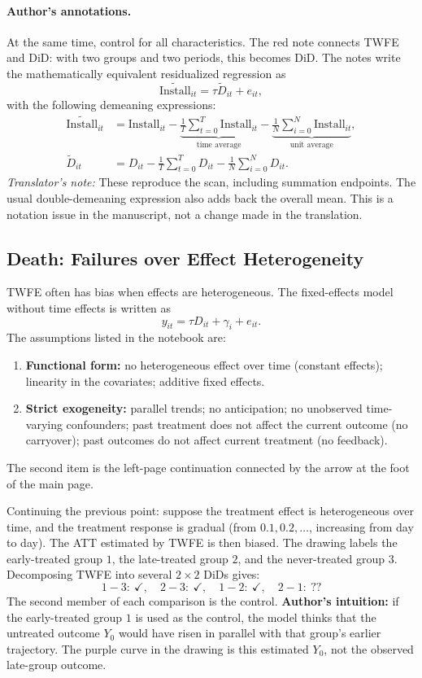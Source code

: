 \paragraph{Author's annotations.}
At the same time, control for all characteristics. The red note connects TWFE and DiD: with two groups and two periods, this becomes DiD.
The notes write the mathematically equivalent residualized regression as
\[
\widetilde{\mathrm{Install}}_{it}=\tau\widetilde D_{it}+e_{it},
\]
with the following demeaning expressions:
\begin{align*}
\widetilde{\mathrm{Install}}_{it}
 &=\mathrm{Install}_{it}
 -\underbrace{\frac1T\sum_{t=0}^{T}\mathrm{Install}_{it}}_{\text{time average}}
 -\underbrace{\frac1N\sum_{i=0}^{N}\mathrm{Install}_{it}}_{\text{unit average}},\\
\widetilde D_{it}
 &=D_{it}-\frac1T\sum_{t=0}^{T}D_{it}-\frac1N\sum_{i=0}^{N}D_{it}.
\end{align*}
\textit{Translator's note:} These reproduce the scan, including summation endpoints. The usual double-demeaning expression also adds back the overall mean. This is a notation issue in the manuscript, not a change made in the translation.

\subsection{Death: Failures over Effect Heterogeneity}
TWFE often has bias when effects are heterogeneous. The fixed-effects model without time effects is written as
\[
y_{it}=\tau D_{it}+\gamma_i+e_{it}.
\]
The assumptions listed in the notebook are:
\begin{enumerate}
\item \textbf{Functional form:} no heterogeneous effect over time (constant effects); linearity in the covariates; additive fixed effects.
\item \textbf{Strict exogeneity:} parallel trends; no anticipation; no unobserved time-varying confounders; past treatment does not affect the current outcome (no carryover); past outcomes do not affect current treatment (no feedback).
\end{enumerate}
The second item is the left-page continuation connected by the arrow at the foot of the main page.

Continuing the previous point: suppose the treatment effect is heterogeneous over time, and the treatment response is gradual (from \(0.1,0.2,\ldots\), increasing from day to day). The ATT estimated by TWFE is then biased.
The drawing labels the early-treated group \(1\), the late-treated group \(2\), and the never-treated group \(3\). Decomposing TWFE into several \(2\times2\) DiDs gives:
\[
1-3:\ \checkmark,\quad
2-3:\ \checkmark,\quad
1-2:\ \checkmark,\quad
2-1:\ \text{??}
\]
The second member of each comparison is the control. \textbf{Author's intuition:} if the early-treated group \(1\) is used as the control, the model thinks that the untreated outcome \(Y_0\) would have risen in parallel with that group's earlier trajectory. The purple curve in the drawing is this estimated \(Y_0\), not the observed late-group outcome.

